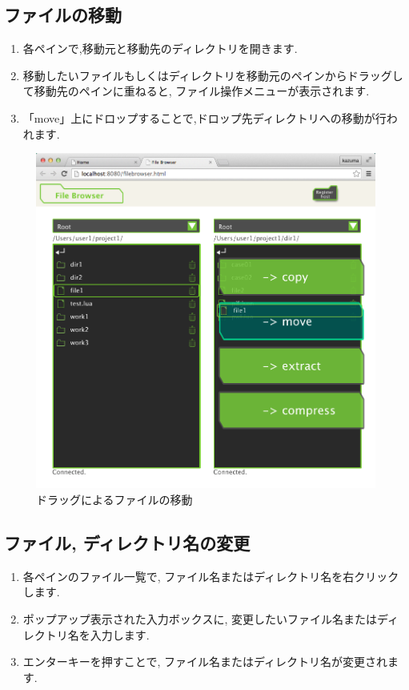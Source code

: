 \documentclass[a4paper,10pt,oneside]{jsbook}
\begin{document}
\subsection{ファイルの移動}
\begin{enumerate}
	\item 各ペインで,移動元と移動先のディレクトリを開きます.
	\item 移動したいファイルもしくはディレクトリを移動元のペインからドラッグして移動先のペインに重ねると,
		  ファイル操作メニューが表示されます.
	\item 「move」上にドロップすることで,ドロップ先ディレクトリへの移動が行われます.
\end{enumerate}
\begin{figure}[H]
	\begin{center}
		\includegraphics[width=12.0cm]{image/filebrowser_004.png}
	\end{center}
	\caption{ドラッグによるファイルの移動}
	\label{fig:filebrowser_filemove}
\end{figure}

\subsection{ファイル, ディレクトリ名の変更}
\begin{enumerate}
	\item 各ペインのファイル一覧で, ファイル名またはディレクトリ名を右クリックします.
	\item ポップアップ表示された入力ボックスに, 変更したいファイル名またはディレクトリ名を入力します.
	\item エンターキーを押すことで, ファイル名またはディレクトリ名が変更されます.
\end{enumerate}
\end{document}
